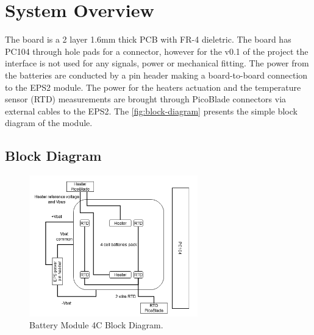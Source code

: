 %
%
%
%
%

%
%
%
%
%
%

\chapter{System Overview} \label{ch:system-overview}

The board is a 2 layer 1.6mm thick PCB with FR-4 dieletric. The board has PC104 through hole pads for a connector, however for the v0.1 of the project the interface is not used for any signals, power or mechanical fitting.
The power from the batteries are conducted by a pin header making a board-to-board connection to the EPS2 module. The power for the heaters actuation and the temperature sensor (RTD) measurements are brought through PicoBlade connectors via external cables to the EPS2.
The \autoref{fig:block-diagram} presents the simple block diagram of the module.

\section{Block Diagram}

\begin{figure}[!ht]
    \begin{center}
        \includegraphics[width=0.65\textwidth]{figures/bat4c_block_diagram}
        \caption{Battery Module 4C Block Diagram.}
        \label{fig:block-diagram}
    \end{center}
\end{figure}
